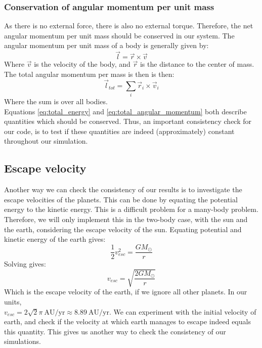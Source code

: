 \documentclass[a4paper, 10pt]{article}
\begin{document}
\subsubsection{Conservation of angular momentum per unit mass}
As there is no external force, there is also no external torque. Therefore, the net angular momentum per unit mass should be conserved in our system. The angular momentum per unit mass of a body is generally given by:
$$\vec{l}=\vec{r}\times \vec{v}$$
Where $\vec{v}$ is the velocity of the body, and $\vec{r}$ is the distance to the center of mass. The total angular momentum per mass is then is then:
\begin{equation}\label{eq:total_angular_momentum}
\vec{l}_{tot}=\sum_i \vec{r}_i\times \vec{v}_i
\end{equation}
Where the sum is over all bodies.\\
\linebreak
Equations \ref{eq:total_energy} and \ref{eq:total_angular_momentum} both describe quantities which should be conserved. Thus, an important consistency check for our code, is to test if these quantities are indeed (approximately) constant throughout our simulation.
\subsection{Escape velocity}\label{escape_vel_section}
Another way we can check the consistency of our results is to investigate the escape velocities of the planets. This can be done by equating the potential energy to the kinetic energy. This is a difficult problem for a many-body problem. Therefore, we will only implement this in  the two-body case, with the sun and the earth, considering the escape velocity of the sun. Equating potential and kinetic energy of the earth gives: 
$$\frac{1}{2}v_{esc}^2=\frac{GM_{\odot}}{r}$$
Solving gives:
\begin{equation}
v_{esc}=\sqrt{\frac{2GM_{\odot}}{r}}
\end{equation}
Which is the escape velocity of the earth, if we ignore all other planets. In our units,\\ $v_{esc} = 2\sqrt{2}\pi\ \mathrm{AU/yr} \approx 8.89 \ \mathrm{AU/yr}$. We can experiment with the initial velocity of earth, and check if the velocity at which earth manages to escape indeed equals this quantity. This gives us another way to check the consistency of our simulations.
\end{document}
